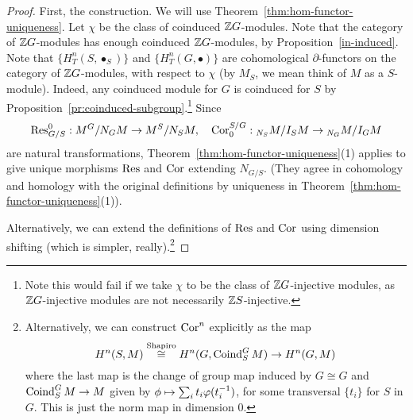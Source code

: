 \begin{proof}
First, the construction. We will use Theorem~\ref{thm:hom-functor-uniqueness}. 
Let $\chi$ be the class of coinduced $\mathbb{Z} G$-modules. Note that the category of $\mathbb{Z} G$-modules has enough coinduced $\mathbb{Z} G$-modules, by Proposition~\ref{in-induced}. 
Note that $\{H_T^n(S,\bullet_S)\}$ and $\{H_T^n(G,\bullet)\}$ are cohomological $\partial$-functors on the category of $\mathbb{Z} G$-modules, with respect to $\chi$ (by $M_S$, we mean think of $M$ as a $S$-module). Indeed, any coinduced module for $G$ is coinduced for $S$ by Proposition~\ref{pr:coinduced-subgroup}.\footnote{Note this would fail if we take $\chi$ to be the class of $\mathbb{Z} G$-injective modules, as $\mathbb{Z} G$-injective modules are not necessarily $\mathbb{Z} S$-injective.} Since \[\operatorname{Res}_{G/S}^0:M^G/N_GM\to M^S/N_SM,\quad 
\operatorname{Cor}^{S/G}_0:{}_{N_S}M/I_SM\to {}_{N_G}M/I_GM\]
are natural transformations, Theorem~\ref{thm:hom-functor-uniqueness}(1) applies to give unique morphisms $\operatorname{Res}$ and $\operatorname{Cor}$ extending $N_{G/S}$. (They agree in cohomology and homology with the original definitions by uniqueness in Theorem~\ref{thm:hom-functor-uniqueness}(1)).

Alternatively, we can extend the definitions of $\operatorname{Res}$ and $\operatorname{Cor}$ using dimension shifting (which is simpler, really).\footnote{Alternatively, we can construct $\operatorname{Cor}^n$ explicitly as the map
\[
H^n(S,M)\stackrel{\text{Shapiro}}{\cong} H^n(G,\operatorname{Coind}^G_S M)\to H^n(G,M)
\]
where the last map is the change of group map induced by $G\cong G$ and $\operatorname{Coind}^G_S M\to M$ given by $\phi\mapsto \sum_{i} t_i\varphi(t_i^{-1})$, for some transversal $\{t_i\}$ for $S$ in $G$. This is just the norm map in dimension 0.}


\end{proof}

